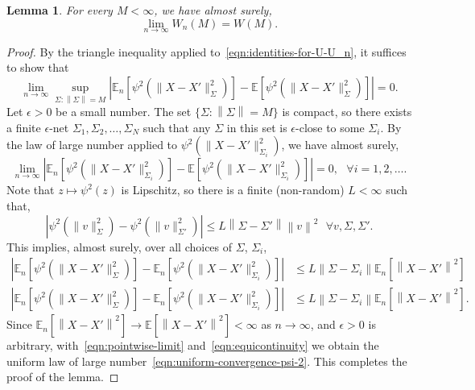 \documentclass[sn-mathphys-num]{sn-jnl}%
\numberwithin{equation}{section}
\newcommand{\E}{\mathbb{E}}
\newcommand{\norm}[1]{\left\|{#1}\right\|} %
\newtheorem{lemma}{Lemma}
\newcommand{\eps}{\epsilon}
\theoremstyle{thmstyleone}%
\theoremstyle{thmstyletwo}%
\theoremstyle{thmstylethree}%
\begin{document}
\vspace{.5em} 
\begin{lemma}
\label{lemma:convergence-U-n-U}
For every $M < \infty$, we have almost surely,
\begin{equation*}
	\lim_{n \to \infty} W_n(M) = W(M).
\end{equation*}
\end{lemma} 
\begin{proof}
By the triangle inequality applied to~\eqref{eqn:identities-for-U-U_n}, it suffices to show that
\begin{equation}
\label{eqn:uniform-convergence-psi-2}
\lim_{n \to \infty} \sup_{\Sigma: \norm{\Sigma} = M} |\E_n[\psi^2\!\left(\|X - X'\|_{\Sigma}^2\right)] - \E[\psi^2\!\left(\|X - X'\|_{\Sigma}^2\right)]| = 0. 
\end{equation}
Let $\eps> 0$ be a small number. The set $\{\Sigma: \norm{\Sigma} = M\}$ is compact, so there exists a finite $\eps$-net 
$\Sigma_1, \Sigma_2, \ldots, \Sigma_N$ such that any $\Sigma$ in this set is $\eps$-close to some $\Sigma_i$. By the law of 
large number applied to $\psi^2\!\left(\|X - X'\|_{\Sigma_i}^2\right)$, we have almost surely, 
\begin{equation}
\label{eqn:pointwise-limit}
	\lim_{n \to \infty} |\E_n[\psi^2\!\left(\|X - X'\|_{\Sigma_i}^2\right)] - \E[\psi^2\!\left(\|X - X'\|_{\Sigma_i}^2\right)]| = 0,~~~\forall i = 1, 2, \ldots.
\end{equation}
Note that $z \mapsto \psi^2(z)$ is Lipschitz, so there is a finite (non-random) $L < \infty$ such that,
\begin{equation*}
	|\psi^2\!\left(\|v\|_{\Sigma}^2\right)  - \psi^2\!\left(\|v\|_{\Sigma'}^2\right) | \le L \norm{\Sigma- \Sigma'} \norm{v}^2~~~\forall v, \Sigma, \Sigma'.
\end{equation*}
This implies, almost surely, over all choices of $\Sigma$, $\Sigma_i$, 
\begin{equation}
\label{eqn:equicontinuity}
\begin{split} 
	|\E_n[\psi^2\!\left(\|X-X'\|_{\Sigma}^2\right)] - \E_n[\psi^2\!\left(\|X-X'\|_{\Sigma_i}^2\right)]| &\le L \norm{\Sigma- \Sigma_i} \E_n[\norm{X-X'}^2] \\
	|\E_n[\psi^2\!\left(\|X-X'\|_{\Sigma}^2\right)] - \E_n[\psi^2\!\left(\|X-X'\|_{\Sigma_i}^2\right)]| &\le L \norm{\Sigma- \Sigma_i} \E_n[\norm{X-X'}^2].
\end{split} 
\end{equation} 
Since $\E_n[\norm{X-X'}^2] \to \E[\norm{X-X'}^2] < \infty$ as $n \to \infty$, and $\eps > 0$ is arbitrary, with~\eqref{eqn:pointwise-limit} 
and~\eqref{eqn:equicontinuity} we obtain
the uniform law of large number~\eqref{eqn:uniform-convergence-psi-2}.  This completes the proof of the lemma. 
\end{proof}
\end{document}
